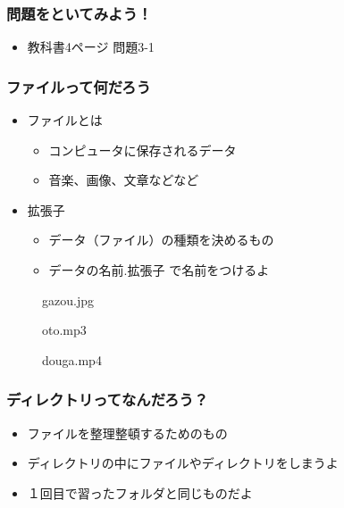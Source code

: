 \begin{frame}
    \frametitle{問題をといてみよう！}
    \begin{itemize}
        \item 教科書4ページ 問題3-1
    \end{itemize}
\end{frame}


\begin{frame}
    \frametitle{ファイルって何だろう}
    \begin{itemize}
        \item ファイルとは
        \begin{itemize}
            \item コンピュータに保存されるデータ
            \item 音楽、画像、文章などなど
        \end{itemize}
        \item 拡張子
        \begin{itemize}
            \item データ（ファイル）の種類を決めるもの
            \item データの名前.拡張子 で名前をつけるよ
        \end{itemize}
    \end{itemize}
    
    \begin{figure}[h]
    \centering
    \begin{minipage}[b]{0.32\columnwidth}
        \centering
        
        \caption{gazou.jpg}
    \end{minipage}
    \begin{minipage}[b]{0.32\columnwidth}
        \centering
        
        \caption{oto.mp3}
    \end{minipage}
    \begin{minipage}[b]{0.32\columnwidth}
        \centering
        
        \caption{douga.mp4}
    \end{minipage}
    \end{figure}
\end{frame}

\begin{frame}
    \frametitle{ディレクトリってなんだろう？}
    \begin{itemize}
        \item ファイルを整理整頓するためのもの
        \item ディレクトリの中にファイルやディレクトリをしまうよ
        \item １回目で習ったフォルダと同じものだよ
    \end{itemize}
\end{frame}

